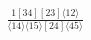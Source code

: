 \documentclass[varwidth, border=5pt]{standalone}
\begin{document}
\begin{my}
$\begin{gathered}
\scriptscriptstyle\frac{1[34][23]⟨12⟩}{⟨14⟩⟨15⟩[24]⟨45⟩}
\end{gathered}$
\end{my}
\end{document}
